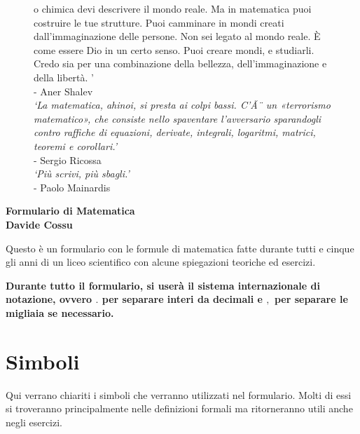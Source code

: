 \documentclass[8pt, a4paper, twocolumn]{extarticle}
\begin{document}
\begin{@twocolumnfalse}
\begin{center}
\begin{figure}[!h]
{{                            o chimica devi descrivere il mondo reale. Ma in matematica puoi 
                            costruire le tue strutture. Puoi camminare in mondi creati 
                            dall'immaginazione delle persone. Non sei legato al 
			    mondo reale. È come essere Dio in un certo senso. Puoi creare mondi, 
                            e studiarli. Credo sia per una combinazione della bellezza, 
                            dell'immaginazione e della libertà. 
			'}\\- Aner Shalev\\ [\baselineskip]
                          \textit{`La matematica, ahinoi, si presta ai colpi bassi. C'Ã¨ un 
                           «terrorismo matematico», che consiste nello spaventare l'avversario 
                          sparandogli contro raffiche di equazioni, derivate, integrali, logaritmi,
                          matrici, teoremi e corollari.'}\\- Sergio Ricossa\\ [\baselineskip]
                          \textit{`Più scrivi, più sbagli.'}\\- Paolo Mainardis}
			\label{fig:octopus}
		\end{figure}
		\vspace{1cm}
		\begin{minipage}{.6\textwidth}				
			\begin{center}
				{\Huge\textbf{Formulario di Matematica}}\\\vspace{0.2cm}
				{\textbf{Davide Cossu}}
			\end{center}
			\vspace{0.5cm}
			Questo è un formulario con le formule di matematica fatte durante tutti e cinque gli anni 
			di un liceo scientifico con alcune spiegazioni teoriche ed esercizi.
		\end{minipage}
	\end{center}
	\clearpage
\end{@twocolumnfalse}

\twocolumn
{
	\hypersetup{linkcolor=black}
	\tableofcontents
}

\newpage
\textbf{Durante tutto il formulario, si userà il sistema internazionale di notazione, ovvero $.$ per 
separare interi da decimali e $,$ per separare le migliaia se necessario.}
\section{Simboli}
Qui verrano chiariti i simboli che verranno utilizzati nel formulario. Molti di essi si troveranno
principalmente nelle definizioni formali ma ritorneranno utili anche negli esercizi.
\end{document}
